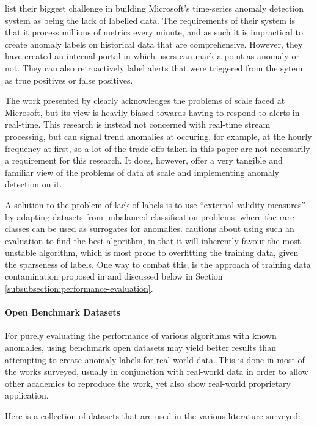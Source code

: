 \documentclass{mproj}
\begin{document}
\cite{MicrosoftTimeSeries} list their biggest challenge in building Microsoft's time-series anomaly detection system as being the lack of labelled data. The requirements of their system is that it process millions of metrics every minute, and as such it is impractical to create anomaly labels on historical data that are comprehensive. However, they have created an internal portal in which users can mark a point as anomaly or not. They can also retroactively label alerts that were triggered from the sytem as true positives or false positives.

The work presented by \cite{MicrosoftTimeSeries} clearly acknowledges the problems of scale faced at Microsoft, but its view is heavily biased towards having to respond to alerts in real-time. This research is instead not concerned with real-time stream processing, but can signal trend anomalies at occuring, for example, at the hourly frequency at first, so a lot of the trade-offs taken in this paper are not necessarily a requirement for this research. It does, however, offer a very tangible and familiar view of the problems of data at scale and implementing anomaly detection on it.

A solution to the problem of lack of labels is to use ``external validity measures'' \citep{outlierAnalysisBook} by adapting datasets from imbalanced classification problems, where the rare classes can be used as surrogates for anomalies. \cite{outlierAnalysisBook} cautions about using such an evaluation to find the best algorithm, in that it will inherently favour the most unstable algorithm, which is most prone to overfitting the training data, given the sparseness of labels. One way to combat this, is the approach of training data contamination proposed in \cite{DAGMM} and discussed below in Section \ref{subsubsection:performance-evaluation}.

\paragraph{Open Benchmark Datasets}
\label{paragraph:open-benchmark-datasets}
For purely evaluating the performance of various algorithms with known anomalies, using benchmark open datasets may yield better results than attempting to create anomaly labels for real-world data. This is done in most of the works surveyed, usually in conjunction with real-world data in order to allow other academics to reproduce the work, yet also show real-world proprietary application.

Here is a collection of datasets that are used in the various literature surveyed:
\end{document}
